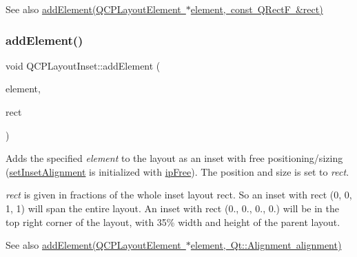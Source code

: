 \begin{DoxySeeAlso}{See also}
\mbox{\hyperlink{class_q_c_p_layout_inset_a8ff61fbee4a1f0ff45c398009d9f1e56}{add\+Element(\+Q\+C\+P\+Layout\+Element $\ast$element, const Q\+Rect\+F \&rect)}} 
\end{DoxySeeAlso}
\mbox{\label{class_q_c_p_layout_inset_a8ff61fbee4a1f0ff45c398009d9f1e56}} 
\subsubsection{\texorpdfstring{add\+Element()}{addElement()}\hspace{0.1cm}{\footnotesize\ttfamily [2/2]}}
{\footnotesize\ttfamily void Q\+C\+P\+Layout\+Inset\+::add\+Element (\begin{DoxyParamCaption}\item[{\mbox{\hyperlink{class_q_c_p_layout_element}{Q\+C\+P\+Layout\+Element}} $\ast$}]{element,  }\item[{const Q\+RectF \&}]{rect }\end{DoxyParamCaption})}

Adds the specified {\itshape element} to the layout as an inset with free positioning/sizing (\mbox{\hyperlink{class_q_c_p_layout_inset_a62882a4f9ad58bb0f53da12fde022abe}{set\+Inset\+Alignment}} is initialized with \mbox{\hyperlink{class_q_c_p_layout_inset_a8b9e17d9a2768293d2a7d72f5e298192aa4802986ea2cea457f932b115acba59e}{ip\+Free}}). The position and size is set to {\itshape rect}.

{\itshape rect} is given in fractions of the whole inset layout rect. So an inset with rect (0, 0, 1, 1) will span the entire layout. An inset with rect (0., 0., 0., 0.) will be in the top right corner of the layout, with 35\% width and height of the parent layout.

\begin{DoxySeeAlso}{See also}
\mbox{\hyperlink{class_q_c_p_layout_inset_ad61529eb576af7f04dff94abb10c745a}{add\+Element(\+Q\+C\+P\+Layout\+Element $\ast$element, Qt\+::\+Alignment alignment)}} 
\end{DoxySeeAlso}
\mbox{\label{class_q_c_p_layout_inset_a832e049f0bb32e7db0490a9c904098df}} 
